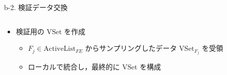 \documentclass[unicode,12pt,aspectratio=169, dvipdfmx]{beamer}
\begin{document}
\begin{frame}{b-2. 検証データ交換}
    \begin{columns}
        \begin{column}[T]{.7\linewidth}
            \begin{itemize}
                \item 検証用の $\mathrm{VSet}$ を作成
                  \begin{itemize}
                    \item $F_j \in \mathrm{ActiveList}_{FE}$ からサンプリングしたデータ $\mathrm{VSet}_{F_j}$ を受領
                    \item ローカルで統合し，最終的に $\mathrm{VSet}$ を構成
                  \end{itemize}
            \end{itemize}
        \end{column}
    \end{columns}
\end{frame}
\end{document}
